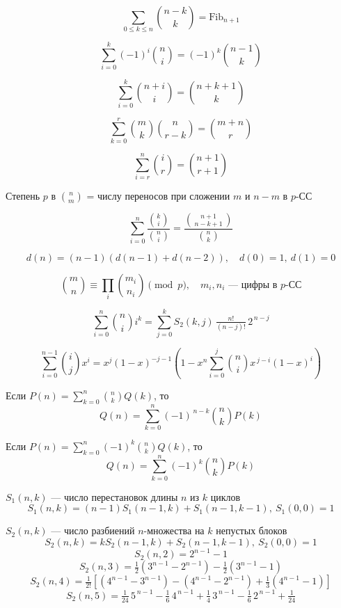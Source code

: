 \small
\[
\sum_{0\le k \le n} \binom{n-k}{k} = \mathrm{Fib}_{n+1}
\]

\[
\sum_{i=0}^{k} (-1)^i \binom{n}{i} = (-1)^k \binom{n-1}{k}
\]

\[
\sum_{i=0}^{k} \binom{n+i}{i} = \binom{n+k+1}{k}
\]

\[
\sum_{k=0}^{r} \binom{m}{k}\binom{n}{r-k} = \binom{m+n}{r}
\]

\[
\sum_{i=r}^{n} \binom{i}{r} = \binom{n+1}{r+1}
\]

Степень $p$ в $\binom{n}{m}$ = числу переносов при сложении $m$ и $n-m$ в $p$-СС

\[
\sum_{i=0}^{n} \frac{\binom{k}{i}}{\binom{n}{i}} = \frac{\binom{n+1}{\,n-k+1\,}}{\binom{n}{k}}
\]

\[
d(n) = (n-1)(d(n-1)+d(n-2)),\quad d(0)=1,\ d(1)=0
\]

\[
\binom{m}{n} \equiv \prod_{i} \binom{m_i}{n_i} \pmod p,\quad
\text{$m_i,n_i$ — цифры в $p$-СС}
\]

\[
\sum_{i=0}^{n} \binom{n}{i} i^k
=\sum_{j=0}^{k} S_2(k,j)\,\tfrac{n!}{(n-j)!}\,2^{\,n-j}
\]

\[
\sum_{i=0}^{n-1} \binom{i}{j} x^i
= x^j(1-x)^{-j-1}\!\left(1-x^n\sum_{i=0}^j \binom{n}{i} x^{\,j-i}(1-x)^i\right)
\]

Если \(P(n)=\sum_{k=0}^{n}\binom{n}{k}Q(k)\), то
\[
Q(n)=\sum_{k=0}^{n}(-1)^{\,n-k}\binom{n}{k}P(k)
\]

Если \(P(n)=\sum_{k=0}^{n}(-1)^k\binom{n}{k}Q(k)\), то
\[
Q(n)=\sum_{k=0}^{n}(-1)^k\binom{n}{k}P(k)
\]

$S_1(n,k)$ — число перестановок длины $n$ из $k$ циклов
\[
S_1(n,k)=(n-1)S_1(n-1,k)+S_1(n-1,k-1),\ S_1(0,0)=1
\]

$S_2(n,k)$ — число разбиений $n$-множества на $k$ непустых блоков
\[
S_2(n,k)=kS_2(n-1,k)+S_2(n-1,k-1),\ S_2(0,0)=1
\]
\[
S_2(n,2)=2^{n-1}-1
\]
\[
S_2(n,3)=\tfrac{1}{2}(3^{n-1}-2^{n-1})-\tfrac{1}{2}(3^{n-1}-1)
\]
\[
S_2(n,4)=\tfrac{1}{2!}\left[(4^{n-1}-3^{n-1})-(4^{n-1}-2^{n-1})+\tfrac{1}{3}(4^{n-1}-1)\right]
\]
\[
S_2(n,5)=\tfrac{1}{24}\,5^{\,n-1}-\tfrac{1}{6}\,4^{\,n-1}
+\tfrac{1}{4}\,3^{\,n-1}-\tfrac{1}{6}\,2^{\,n-1}
+\tfrac{1}{24}
\]

